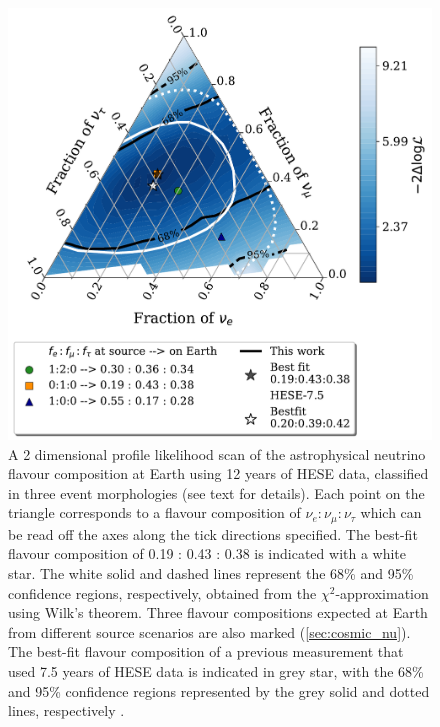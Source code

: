 \begin{figure}
    
    \includegraphics{./figures/results/HESE12_fancy_coverage_say_withhese7.pdf}
    \caption{A 2 dimensional profile likelihood scan of the astrophysical neutrino flavour composition at Earth using 12 years of HESE data, classified in three event morphologies (see text for details). Each point on the triangle corresponds to a flavour composition of $\nu_e : \nu_{\mu} : \nu_{\tau}$ which can be read off the axes along the tick directions specified. The best-fit flavour composition of 0.19 : 0.43 : 0.38 is indicated with a white star. The white solid and dashed lines represent the 68\% and 95\% confidence regions, respectively, obtained from the $\chi^2$-approximation using Wilk's theorem. Three flavour compositions expected at Earth from different source scenarios are also marked (\ref{sec:cosmic_nu}). The best-fit flavour composition of a previous measurement that used 7.5 years of HESE data is indicated in grey star, with the 68\% and 95\% confidence regions represented by the grey solid and dotted lines, respectively \cite{Juliana_paper}.}

\end{figure}


